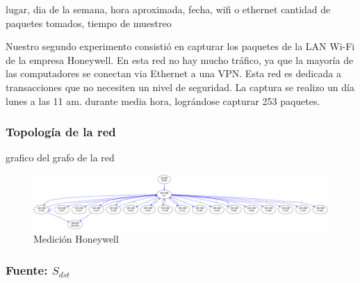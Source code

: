 \documentclass[10pt, a4paper]{article}
\begin{document}
lugar, dia de la semana, hora aproximada, fecha, wifi o ethernet
cantidad de paquetes tomados, tiempo de muestreo

Nuestro segundo experimento consistió en capturar los paquetes de la LAN Wi-Fi de la empresa Honeywell. En esta red no hay mucho tráfico, ya que la mayoría de las computadores se conectan via Ethernet a una VPN. Esta red es dedicada a transacciones que no necesiten un nivel de seguridad. La captura se realizo un día lunes a las 11 am. durante media hora, lográndose capturar 253 paquetes.	

\subsubsection{Topología de la red}

grafico del grafo de la red

\begin{figure}[H]
 \begin{center}
  \includegraphics[width=\linewidth]{../imgs/prueba_laburo-ips_red.png}
  \caption{Medición Honeywell}
 \end{center}
\end{figure}


\subsubsection{Fuente: $S_{dst}$}
\end{document}
